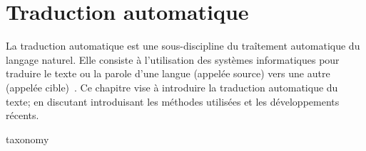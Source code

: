 \chapter{Traduction automatique}


La traduction automatique est une sous-discipline du traîtement automatique du langage naturel.
Elle consiste à l'utilisation des systèmes informatiques pour traduire le texte ou la parole d'une langue (appelée source) vers une autre (appelée cible)~\cite{routledge}.
Ce chapitre vise à introduire la traduction automatique du texte;
en discutant introduisant les méthodes utilisées et les développements récents.

{taxonomy}